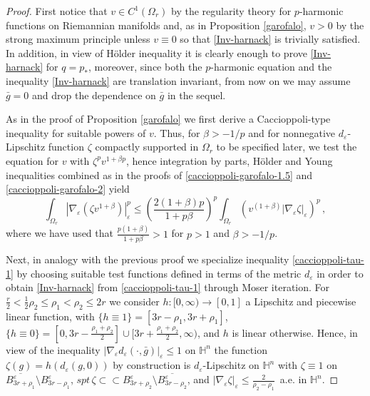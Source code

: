 \documentclass[10pt]{amsart}
\numberwithin{equation}{section}
\theoremstyle{definition}
\newcommand{\He}{\mathbb{H}}
\begin{document}
\begin{proof}
First notice that $v \in C^1(\Omega_r)$ by the regularity theory for $p$-harmonic functions on Riemannian manifolds and, as in Proposition \ref{garofalo}, $v>0$ by the strong maximum principle unless $v \equiv 0$ so that \eqref{Inv-harnack} is trivially satisfied. 
In addition, in view of H\"{o}lder inequality it is clearly enough to prove \eqref{Inv-harnack} for $q=p_*$, moreover, since both the $p$-harmonic equation and the inequality \eqref{Inv-harnack} are translation invariant, from now on we may assume $\bar{g}=0$ and drop the dependence on $\bar{g}$ in the sequel. 

As in the proof of Proposition \ref{garofalo} we first derive a Caccioppoli-type inequality for suitable powers of $v$. Thus, for $\beta > -1/p$ and for nonnegative $d_\varepsilon$-Lipschitz function $\zeta$ compactly supported in $\Omega_r$ to be specified later, we test the equation for $v$ with $\zeta^p v^{1+\beta p}$, hence integration by parts, H\"{o}lder and Young inequalities combined as in the proofs of \eqref{caccioppoli-garofalo-1.5} and \eqref{caccioppoli-garofalo-2} yield
\begin{equation}
\label{caccioppoli-tau-1}
\int_{\Omega_r}   | \nabla_\varepsilon \left( \zeta v^{1+\beta}\right) |_\varepsilon^p \leq    \left(  \frac{2(1+\beta)p}{1+p\beta} \right)^p \int_{\Omega_r}   \left( v^{(1+\beta) }  |\nabla_\varepsilon \zeta|_\varepsilon \right)^p \, ,
\end{equation} 
where we have used that $\frac{p(1+\beta)}{1+p\beta}>1$ for $p>1$ and $\beta >-1/p$.

Next, in analogy with the previous proof we specialize inequality \eqref{caccioppoli-tau-1} by choosing suitable test functions defined in terms of the metric $d_\varepsilon$ in order to obtain \eqref{Inv-harnack} from \eqref{caccioppoli-tau-1} through Moser iteration. For $\frac{r}2< \frac12 \rho_2 \leq  \rho_1<\rho_2  \leq 2r $  we consider  $h: [0,\infty) \to [0,1]$ a Lipschitz and piecewise linear function, with $\{ h \equiv 1\}=[3r-\rho_1,3r+\rho_1]$, $\{ h \equiv 0\}=[0, 3r-\frac{\rho_1+\rho_2}2] \cup[3r +\frac{\rho_1+\rho_2}2, \infty)$, and $h$ is linear otherwise. Hence, in view of the inequality $|\nabla_\varepsilon d_\varepsilon(\cdot,\bar{g})|_\varepsilon \leq 1$ on $\He^n$ the function $\zeta (g)=h (d_\varepsilon(g,0))$ by construction is $d_\varepsilon$-Lipschitz on $\He^n$ with $\zeta \equiv 1$ on $\overline{B^\varepsilon_{3r+\rho_1}}\setminus B^\varepsilon_{3r-\rho_1}$, $spt \,\zeta \subset \subset B^\varepsilon_{3r+\rho_2} \setminus \overline{B^\varepsilon_{3r-\rho_2}}$, and $| \nabla_\varepsilon  \zeta |_\varepsilon \leq \frac{2}{\rho_2-\rho_1} \, $ a.e. in $\He^n$.


\end{proof}
\end{document}
